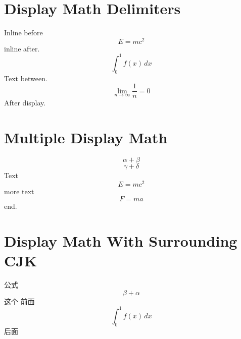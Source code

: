 \documentclass{article}
\begin{document}
\section{Display Math Delimiters}
Inline before
$$
  E = mc^{2}
$$
inline after.
$$
  \int_{0}^{1} f(x) \, dx
$$
Text between.
$$
  \lim_{n \to \infty} \frac{1}{n} = 0
$$
After display.

\section{Multiple Display Math}
$$
  \alpha + \beta
$$
$$
  \gamma + \delta
$$
Text
$$
  E=mc^{2}
$$
more text
$$
  F=ma
$$
end.

\section{Display Math With Surrounding CJK}
公式
$$
  \beta+\alpha
$$
这个
前面
$$
  \int_{0}^{1} f(x)\,dx
$$
后面
\end{document}
